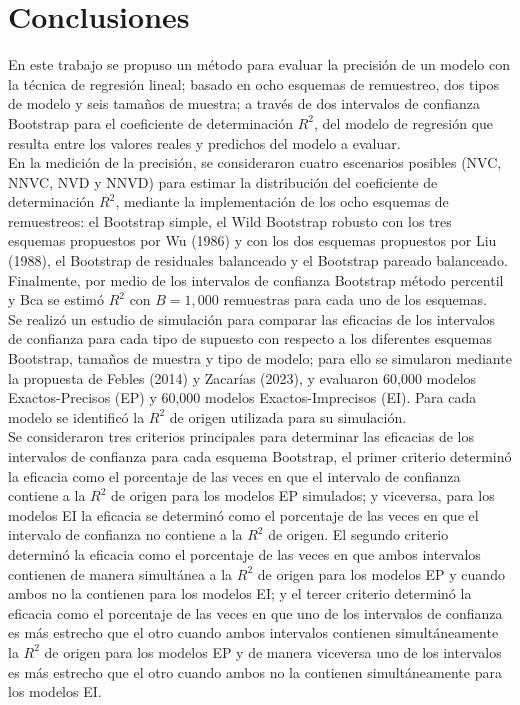    \section{Conclusiones}
En este trabajo se propuso un método para evaluar la precisión de un modelo con la técnica de regresión lineal; basado en ocho esquemas de remuestreo, dos tipos de modelo y seis tamaños de muestra; a través de dos intervalos de confianza Bootstrap para el coeficiente de determinación $R^2$, del modelo de regresión que resulta entre los valores reales y predichos del modelo a evaluar.\\

En la medición de la precisión, se consideraron cuatro escenarios posibles (NVC, NNVC, NVD y NNVD) para estimar la distribución del coeficiente de determinación $R^2$, mediante la implementación de los ocho esquemas de remuestreos: el Bootstrap simple, el Wild Bootstrap robusto con los tres esquemas propuestos por Wu (1986) y con los dos esquemas propuestos por Liu (1988), el Bootstrap de residuales balanceado y el Bootstrap pareado balanceado. Finalmente, por medio de los intervalos de confianza Bootstrap método percentil y Bca se estimó $R^2$ con $B=1,000$ remuestras para cada uno de los esquemas.\\

Se realizó un estudio de simulación para comparar las eficacias de los intervalos de confianza para cada tipo de supuesto con respecto a los diferentes esquemas Bootstrap, tamaños de muestra y tipo de modelo; para ello se simularon mediante la propuesta de Febles (2014) y Zacarías (2023), y evaluaron 60,000 modelos Exactos-Precisos (EP) y 60,000 modelos Exactos-Imprecisos (EI). Para cada modelo se identificó la $R^2$ de origen utilizada para su simulación.\\


Se consideraron tres criterios principales para determinar las eficacias de los intervalos de confianza para cada esquema Bootstrap, el primer criterio determinó la eficacia como el porcentaje de las veces en que el intervalo de confianza contiene a la $R^2$ de origen para los modelos EP simulados; y viceversa, para los modelos EI la eficacia se determinó como el porcentaje de las veces en que el intervalo de confianza no contiene a la $R^2$ de origen. El segundo criterio determinó la eficacia como el porcentaje de las veces en que ambos intervalos contienen de manera simultánea a la $R^2$ de origen para los modelos EP y cuando ambos no la contienen para los modelos EI; y el tercer criterio determinó la eficacia como el porcentaje de las veces en que uno de los intervalos de confianza es más estrecho que el otro cuando ambos intervalos contienen simultáneamente la $R^2$ de origen para los modelos EP y de manera viceversa uno de los intervalos es más estrecho que el otro cuando ambos no la contienen simultáneamente para los modelos EI.\\

